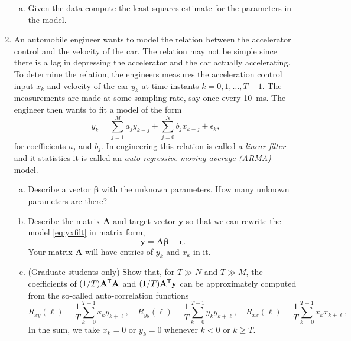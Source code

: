 \documentclass[11pt]{article}
\def\beq{\begin{equation}}
\def\eeq{\end{equation}}
\newcommand{\ybf}{\mathbf{y}}
\newcommand{\Abf}{\mathbf{A}}
\def\betabf{{\boldsymbol \beta}}
\def\epsilonbf{{\boldsymbol \epsilon}}
\newcommand{\tran}{^{\text{\sf T}}}
\begin{document}
\begin{enumerate}
\begin{center}
\begin{enumerate}[(a)]
\item Given the data compute the least-squares estimate for the parameters
in the model.
\end{enumerate}
\end{center}

\item An automobile engineer wants to model the relation
between the accelerator control and the velocity of the car.
The relation may not be simple since there is a lag in depressing
the accelerator and the car actually accelerating.  To determine
the relation, the engineers measures the acceleration control input $x_k$
and velocity of the car $y_k$ at time instants $k=0,1,\ldots,T-1$.
The measurements are made at some sampling rate, say once every 10~ms.
The engineer then wants to fit a model of the form
\beq \label{eq:yxfilt}
    y_k = \sum_{j=1}^M a_j y_{k-j} + \sum_{j=0}^N b_j x_{k-j} + \epsilon_k,
\eeq
for coefficients $a_j$ and $b_j$.
In engineering this relation is called a \emph{linear filter} and
it statistics it is called an \emph{auto-regressive moving average (ARMA)}
model.
\begin{enumerate}[(a)]
\item Describe a vector $\betabf$ with the unknown parameters.
How many unknown parameters are there?

\item Describe the matrix $\Abf$ and target vector $\ybf$ so that we can
rewrite the model \eqref{eq:yxfilt} in matrix form,
\[
    \ybf = \Abf \betabf + \epsilonbf.
\]
Your matrix $\Abf$ will have entries of $y_k$ and $x_k$ in it.

\item (Graduate students only)
Show that, for $T \gg N$ and $T \gg M$,
the coefficients of $(1/T)\Abf\tran\Abf$ and $(1/T)\Abf\tran\ybf$
can be approximately
computed from the so-called auto-correlation functions
\[
    R_{xy}(\ell) = \frac{1}{T} \sum_{k=0}^{T-1} x_ky_{k+\ell}, \quad
    R_{yy}(\ell) = \frac{1}{T} \sum_{k=0}^{T-1} y_ky_{k+\ell}, \quad
    R_{xx}(\ell) = \frac{1}{T} \sum_{k=0}^{T-1} x_k x_{k+\ell}, \quad
\]
In the sum, we take $x_k=0$ or $y_k=0$ whenever $k < 0$ or $k \geq T$.

\end{enumerate}


\end{enumerate}
\end{document}
